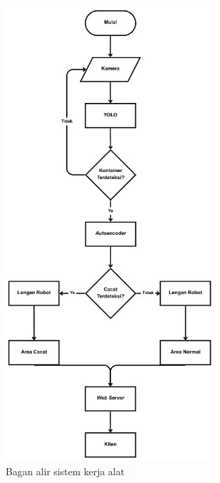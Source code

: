 \begin{figure}[H]
  \centering
  \includegraphics[width=0.7\textwidth]{gambar/flowchart.png}
  \caption{Bagan alir sistem kerja alat}
  \label{fig:bagan-alir-kerja}
\end{figure}
\vspace{-1em}
